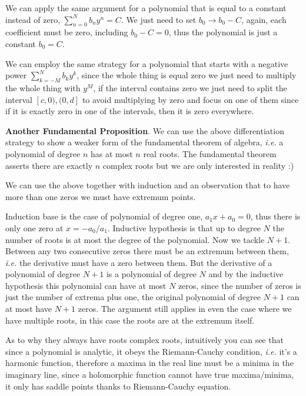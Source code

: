 \documentclass[aps,preprint,preprintnumbers,nofootinbib,showpacs,prd]{revtex4-1}
\newcommand{\ie}{{\it i.e.} }
\begin{document}
We can apply the same argument for a polynomial that is equal to a constant instead of zero, $\sum_{n=0}^N b_n y^n = C$. We just need to set $b_0 \to b_0 - C$, again, each coefficient must be zero, including $b_0 - C = 0$, thus the polynomial is just a constant $b_0 = C$.

We can employ the same strategy for a polynomial that starts with a negative power $\sum_{k=-M}^N b_k y^k$, since the whole thing is equal zero we just need to multiply the whole thing with $y^M$, if the interval contains zero we just need to split the interval $[c,0),(0,d]$ to avoid multiplying by zero and focus on one of them since if it is exactly zero in one of the intervals, then it is zero everywhere.

{\bf Another Fundamental Proposition}. We can use the above differentiation strategy to show a weaker form of the fundamental theorem of algebra, \ie a polynomial of degree $n$ has at most $n$ real roots. The fundamental theorem asserts there are exactly $n$ complex roots but we are only interested in reality :)

We can use the above together with induction and an observation that to have more than one zeros we must have extremum points.

Induction base is the case of polynomial of degree one, $a_1 x + a_0 = 0$, thus there is only one zero at $x = -a_0/a_1$. Inductive hypothesis is that up to degree $N$ the number of roots is at most the degree of the polynomial. Now we tackle $N+1$. Between any two consecutive zeros there must be an extremum between them, \ie the derivative must have a zero between them. But the derivative of a polynomial of degree $N+1$ is a polynomial of degree $N$ and by the inductive hypothesis this polynomial can have at most $N$ zeros, since the number of zeros is just the number of extrema plus one, the original polynomial of degree $N+1$ can at most have $N+1$ zeros. The argument still applies in even the case where we have multiple roots, in this case the roots are at the extremum itself.

As to why they always have roots complex roots, intuitively you can see that since a polynomial is analytic, it obeys the Riemann-Cauchy condition, \ie it's a harmonic function, therefore a maxima in the real line must be a minima in the imaginary line, since a holomorphic function cannot have true maxima/minima, it only has saddle points thanks to Riemann-Cauchy equation.
\end{document}

